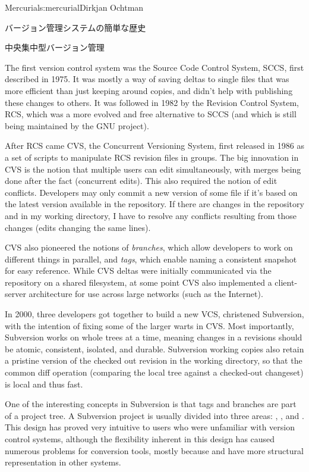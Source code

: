 \begin{aosachapter}{Mercurial}{s:mercurial}{Dirkjan Ochtman}
\begin{aosasect1}{バージョン管理システムの簡単な歴史}
\begin{aosasect2}{中央集中型バージョン管理}

The first version control system was the Source Code Control System,
SCCS, first described in 1975. It was mostly a way of saving deltas to
single files that was more efficient than just keeping around copies,
and didn't help with publishing these changes to others. It was
followed in 1982 by the Revision Control System, RCS, which was a more
evolved and free alternative to SCCS (and which is still being
maintained by the GNU project).

After RCS came CVS, the Concurrent Versioning System, first released
in 1986 as a set of scripts to manipulate RCS revision files in
groups. The big innovation in CVS is the notion that multiple users can
edit simultaneously, with merges being done after the fact
(concurrent edits). This also required the notion of edit conflicts.
Developers may only commit a new version of some file if it's based
on the latest version available in the repository. If there are changes
in the repository and in my working directory, I have to resolve any
conflicts resulting from those changes (edits changing the same lines).

CVS also pioneered the notions of \emph{branches}, which allow
developers to work on different things in parallel, and \emph{tags},
which enable naming a consistent snapshot for easy reference. While
CVS deltas were initially communicated via the repository on a shared
filesystem, at some point CVS also implemented a client-server
architecture for use across large networks (such as the Internet).

In 2000, three developers got together to build a new VCS, christened
Subversion, with the intention of fixing some of the larger
warts in CVS\@. Most importantly, Subversion works on whole trees at a
time, meaning changes in a revisions should be atomic, consistent,
isolated, and durable. Subversion working copies also retain a
pristine version of the checked out revision in the working directory,
so that the common diff operation (comparing the local tree against
a checked-out changeset) is local and thus fast.

One of the interesting concepts in Subversion is that tags and
branches are part of a project tree. A Subversion project is usually
divided into three areas: , , and
. This design has proved very intuitive to users who were
unfamiliar with version control systems, although the flexibility
inherent in this design has caused
numerous problems for conversion tools, mostly because  and
 have more structural representation in other systems.


\end{aosasect2}
\end{aosasect1}
\end{aosachapter}
